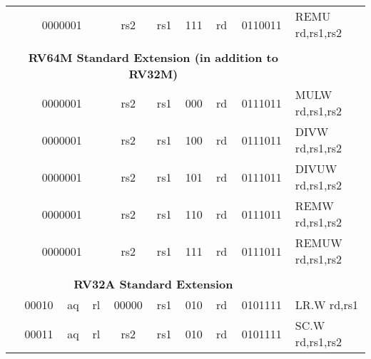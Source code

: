 \begin{table}[p]
\begin{small}
\begin{center}
\begin{tabular}{p{0in}p{0.4in}p{0.05in}p{0.05in}p{0.05in}p{0.05in}p{0.4in}p{0.6in}p{0.4in}p{0.6in}p{0.7in}l}
&
\multicolumn{4}{|c|}{0000001} &
\multicolumn{2}{c|}{rs2} &
\multicolumn{1}{c|}{rs1} &
\multicolumn{1}{c|}{111} &
\multicolumn{1}{c|}{rd} &
\multicolumn{1}{c|}{0110011} & REMU rd,rs1,rs2 \\
\cline{2-11}
  

&
\multicolumn{10}{c}{} & \\
&
\multicolumn{10}{c}{\bf RV64M Standard Extension (in addition to RV32M)} & \\
\cline{2-11}
  

&
\multicolumn{4}{|c|}{0000001} &
\multicolumn{2}{c|}{rs2} &
\multicolumn{1}{c|}{rs1} &
\multicolumn{1}{c|}{000} &
\multicolumn{1}{c|}{rd} &
\multicolumn{1}{c|}{0111011} & MULW rd,rs1,rs2 \\
\cline{2-11}
  

&
\multicolumn{4}{|c|}{0000001} &
\multicolumn{2}{c|}{rs2} &
\multicolumn{1}{c|}{rs1} &
\multicolumn{1}{c|}{100} &
\multicolumn{1}{c|}{rd} &
\multicolumn{1}{c|}{0111011} & DIVW rd,rs1,rs2 \\
\cline{2-11}
  

&
\multicolumn{4}{|c|}{0000001} &
\multicolumn{2}{c|}{rs2} &
\multicolumn{1}{c|}{rs1} &
\multicolumn{1}{c|}{101} &
\multicolumn{1}{c|}{rd} &
\multicolumn{1}{c|}{0111011} & DIVUW rd,rs1,rs2 \\
\cline{2-11}
  

&
\multicolumn{4}{|c|}{0000001} &
\multicolumn{2}{c|}{rs2} &
\multicolumn{1}{c|}{rs1} &
\multicolumn{1}{c|}{110} &
\multicolumn{1}{c|}{rd} &
\multicolumn{1}{c|}{0111011} & REMW rd,rs1,rs2 \\
\cline{2-11}
  

&
\multicolumn{4}{|c|}{0000001} &
\multicolumn{2}{c|}{rs2} &
\multicolumn{1}{c|}{rs1} &
\multicolumn{1}{c|}{111} &
\multicolumn{1}{c|}{rd} &
\multicolumn{1}{c|}{0111011} & REMUW rd,rs1,rs2 \\
\cline{2-11}
  

&
\multicolumn{10}{c}{} & \\
&
\multicolumn{10}{c}{\bf RV32A Standard Extension} & \\
\cline{2-11}
  

&
\multicolumn{2}{|c|}{00010} &
\multicolumn{1}{c|}{aq} &
\multicolumn{1}{c|}{rl} &
\multicolumn{2}{c|}{00000} &
\multicolumn{1}{c|}{rs1} &
\multicolumn{1}{c|}{010} &
\multicolumn{1}{c|}{rd} &
\multicolumn{1}{c|}{0101111} & LR.W rd,rs1 \\
\cline{2-11}
  

&
\multicolumn{2}{|c|}{00011} &
\multicolumn{1}{c|}{aq} &
\multicolumn{1}{c|}{rl} &
\multicolumn{2}{c|}{rs2} &
\multicolumn{1}{c|}{rs1} &
\multicolumn{1}{c|}{010} &
\multicolumn{1}{c|}{rd} &
\multicolumn{1}{c|}{0101111} & SC.W rd,rs1,rs2 \\
\cline{2-11}
  


\end{tabular}
\end{center}
\end{small}
\end{table}
